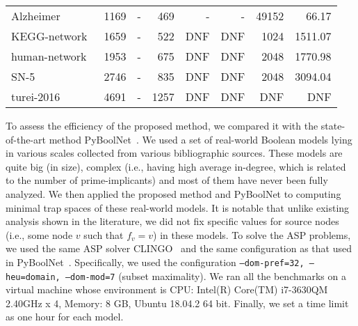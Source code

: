 \documentclass[runningheads]{llncs}
\newcommand{\vangiang}[1]{\textcolor{magenta}{#1}}
\newcommand{\sylvain}[1]{\textcolor{teal}{#1}}
\begin{document}
\begin{table}[!htb]
\begin{tabular}{lrrrrrrr}
    Alzheimer~\cite{aghamiri2020automated} & 1169 & - & 469 & - & - & 49152 & 66.17 \\
    KEGG-network~\cite{DBLP:journals/bmcsb/Kwon16} & 1659 & - & 522 & DNF & DNF & 1024 & 1511.07 \\
    human-network~\cite{kim2011reduction} & 1953 & - & 675 & DNF & DNF & 2048 & 1770.98 \\ \midrule
    
    SN-5~\cite{kim2013rmod} & 2746 & - & 835 & DNF & DNF & 2048 & 3094.04 \\
    turei-2016~\cite{lee2019signal} & 4691 & - & 1257 & DNF & DNF & DNF & DNF \\
    
    \bottomrule
  \end{tabular}

\end{table}

To assess the efficiency of the proposed method, we compared it with the state-of-the-art method PyBoolNet~\cite{klarner2017pyboolnet}.
We used a set of real-world Boolean models lying in various scales collected from various bibliographic sources.
These models are quite big (in size), complex (i.e., having high average in-degree, which is related to the number of prime-implicants) and most of them have never been fully analyzed.
We then applied the proposed method and PyBoolNet to computing minimal trap spaces of these real-world models.
It is notable that unlike existing analysis shown in the literature, we did not fix specific values for source nodes (i.e., some node \(v\) such that \(f_v = v\)) in these models.
To solve the ASP problems, we used the same ASP solver CLINGO~\cite{DBLP:journals/aicom/GebserKKOSS11} and the same configuration as that used in PyBoolNet~\cite{klarner2015computing}.
Specifically, we used the configuration \texttt{--dom-pref=32, --heu=domain, --dom-mod=7} (subset maximality). We ran all the benchmarks on a virtual machine whose environment is CPU: Intel(R) Core(TM) i7-3630QM 2.40GHz x 4, Memory: 8 GB, Ubuntu 18.04.2 64 bit. Finally, we set a time limit as one hour for each model.

\end{document}
